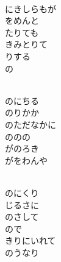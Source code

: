 \documentclass[10pt,b5j]{tarticle} %
\begin{document}
\vspace{1.5em} %
\newcommand{\linespace}{0.5em} %
\newcommand{\blocksize}{0.5\hsize} %
\newcommand{\itemmargin}{6em} %
\begin{enumerate} %
    \setlength{\itemindent}{\itemmargin} %
    \begin{minipage}[c]{\blocksize}
    
        \vspace{\linespace}
        \item~\\
        にきしらもが\\
        をめんと\\
        たりても\\
        きみとりて\\
        りする\\
        の
        
        \vspace{\linespace}
        \item~\\
        のにちる\\
        のりかか\\
        のただなかに\\
        ののの\\
        がのろき\\
        がをわんや
        
        \vspace{\linespace}
        \item~\\
        のにくり\\
        じるさに\\
        のさして\\
        ので\\
        きりにいれて\\
        のうなり
        

\end{minipage}
\end{enumerate}
\end{document}
